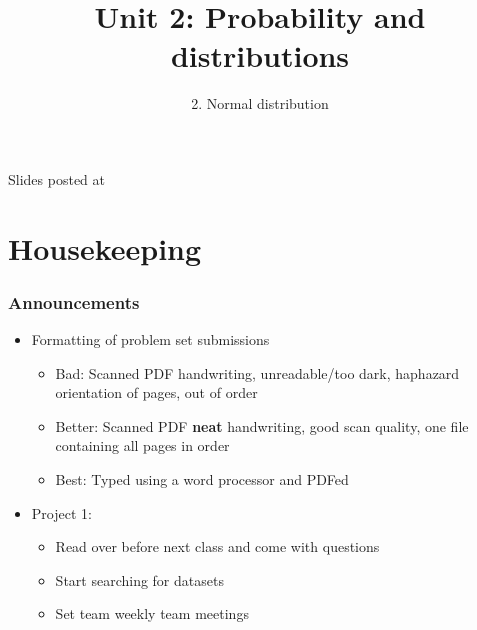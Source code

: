 \documentclass[11pt,containsverbatim,handout,xcolor=xelatex,dvipsnames,table]{beamer}
\title{Unit 2: Probability and distributions}
\subtitle{2. Normal distribution}
\author{\CourseName}
\date{}
\institute{\InstituteName}
\begin{document}



\begin{frame}[plain]

\titlepage

\vfill

{\scriptsize {} \hfill Slides posted at  \webURL{\CourseSite}}

\addtocounter{framenumber}{-1} 

\end{frame}


\section{Housekeeping}


\begin{frame}
\frametitle{Announcements}

\begin{itemize}

\item Formatting of problem set submissions
\begin{itemize}
\item Bad: Scanned PDF handwriting, unreadable/too dark, haphazard orientation of pages, out
of order
\item Better: Scanned PDF \textbf{neat} handwriting, good scan quality, one file containing
all pages in order
\item Best: Typed using a word processor and PDFed
\end{itemize}

\item Project 1: 
\begin{itemize}
\item Read over before next class and come with questions
\item Start searching for datasets
\item Set team weekly team meetings
\end{itemize}

\end{itemize}

\end{frame}
\end{document}
